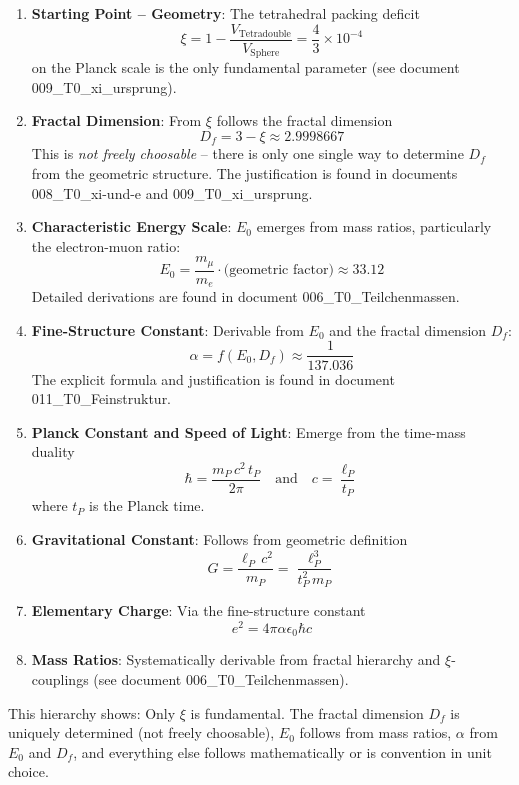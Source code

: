 	\begin{enumerate}
		\item \textbf{Starting Point -- Geometry}: The tetrahedral packing deficit
		\[
		\xi = 1 - \frac{V_{\text{Tetradouble}}}{V_{\text{Sphere}}} = \frac{4}{3} \times 10^{-4}
		\]
		on the Planck scale is the only fundamental parameter (see document 009\_T0\_xi\_ursprung).
		
		\item \textbf{Fractal Dimension}: From $\xi$ follows the fractal dimension
		\[
		D_f = 3 - \xi \approx 2.9998667
		\]
		This is \emph{not freely choosable} -- there is only one single way to determine $D_f$ from the geometric structure. The justification is found in documents 008\_T0\_xi-und-e and 009\_T0\_xi\_ursprung.
		
		\item \textbf{Characteristic Energy Scale}: $E_0$ emerges from mass ratios, particularly the electron-muon ratio:
		\[
		E_0 = \frac{m_\mu}{m_e} \cdot \text{(geometric factor)} \approx 33.12
		\]
		Detailed derivations are found in document 006\_T0\_Teilchenmassen.
		
		\item \textbf{Fine-Structure Constant}: Derivable from $E_0$ and the fractal dimension $D_f$:
		\[
		\alpha = f(E_0, D_f) \approx \frac{1}{137.036}
		\]
		The explicit formula and justification is found in document 011\_T0\_Feinstruktur.
		
		\item \textbf{Planck Constant and Speed of Light}: Emerge from the time-mass duality
		\[
		\hbar = \frac{m_P \, c^2 \, t_P}{2\pi} \quad \text{and} \quad c = \frac{\ell_P}{t_P}
		\]
		where $t_P$ is the Planck time.
		
		\item \textbf{Gravitational Constant}: Follows from geometric definition
		\[
		G = \frac{\ell_P \, c^2}{m_P} = \frac{\ell_P^3}{t_P^2 \, m_P}
		\]
		
		\item \textbf{Elementary Charge}: Via the fine-structure constant
		\[
		e^2 = 4\pi \alpha \epsilon_0 \hbar c
		\]
		
		\item \textbf{Mass Ratios}: Systematically derivable from fractal hierarchy and $\xi$-couplings (see document 006\_T0\_Teilchenmassen).
	\end{enumerate}
	
	This hierarchy shows: Only $\xi$ is fundamental. The fractal dimension $D_f$ is uniquely determined (not freely choosable), $E_0$ follows from mass ratios, $\alpha$ from $E_0$ and $D_f$, and everything else follows mathematically or is convention in unit choice.
	
